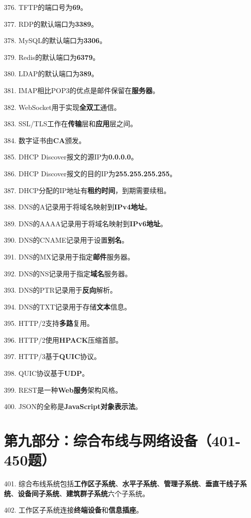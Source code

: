 \documentclass[12pt,a4paper,openany]{ctexbook}
\begin{document}
376. TFTP的端口号为\textbf{69}。

377. RDP的默认端口为\textbf{3389}。

378. MySQL的默认端口为\textbf{3306}。

379. Redis的默认端口为\textbf{6379}。

380. LDAP的默认端口为\textbf{389}。

381. IMAP相比POP3的优点是邮件保留在\textbf{服务器}。

382. WebSocket用于实现\textbf{全双工}通信。

383. SSL/TLS工作在\textbf{传输}层和\textbf{应用}层之间。

384. 数字证书由\textbf{CA}颁发。

385. DHCP Discover报文的源IP为\textbf{0.0.0.0}。

386. DHCP Discover报文的目的IP为\textbf{255.255.255.255}。

387. DHCP分配的IP地址有\textbf{租约时间}，到期需要续租。

388. DNS的A记录用于将域名映射到\textbf{IPv4地址}。

389. DNS的AAAA记录用于将域名映射到\textbf{IPv6地址}。

390. DNS的CNAME记录用于设置\textbf{别名}。

391. DNS的MX记录用于指定\textbf{邮件}服务器。

392. DNS的NS记录用于指定\textbf{域名}服务器。

393. DNS的PTR记录用于\textbf{反向}解析。

394. DNS的TXT记录用于存储\textbf{文本}信息。

395. HTTP/2支持\textbf{多路}复用。

396. HTTP/2使用\textbf{HPACK}压缩首部。

397. HTTP/3基于\textbf{QUIC}协议。

398. QUIC协议基于\textbf{UDP}。

399. REST是一种\textbf{Web服务}架构风格。

400. JSON的全称是\textbf{JavaScript对象表示法}。

\section{第九部分：综合布线与网络设备（401-450题）}

401. 综合布线系统包括\textbf{工作区子系统}、\textbf{水平子系统}、\textbf{管理子系统}、\textbf{垂直干线子系统}、\textbf{设备间子系统}、\textbf{建筑群子系统}六个子系统。

402. 工作区子系统连接\textbf{终端设备}和\textbf{信息插座}。
\end{document}
